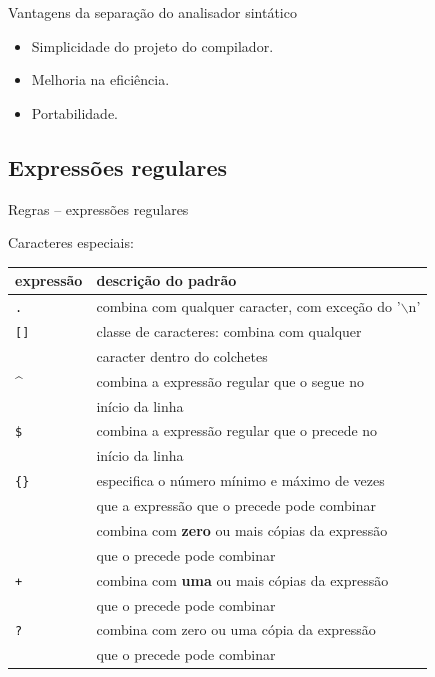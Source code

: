 \begin{frame}{Vantagens da separação do analisador sintático}

\pause

\begin{itemize}[<+->]
\item Simplicidade do projeto do compilador.\bigskip
\item Melhoria na eficiência.\bigskip
\item Portabilidade.
\end{itemize}

\end{frame}

\subsection{Expressões regulares}
\frame{\tableofcontents[currentsubsection]}

\begin{frame}{Regras -- expressões regulares}

 Caracteres especiais:\bigskip

 \footnotesize
 \center
\begin{tabular}{ll}\toprule
  \bf expressão  & \bf  descrição do padrão \\
  \midrule
  {\tt .}          &  combina com qualquer caracter, com exceção do '{$\backslash$n}'\\
  {\tt []}         &  classe de caracteres: combina com qualquer\\
                 &  caracter dentro do colchetes\\
   \^{}            &  combina a expressão regular que o segue no\\
                 &  início da linha\\
  {\tt \$}          &  combina a expressão regular que o precede no\\
                 &  início da linha\\
  {\tt \{\}}         &  especifica o número mínimo e máximo de vezes\\
                 &  que a expressão que o precede pode combinar\\
  {\tt *}          &  combina com {\bf zero} ou mais cópias da expressão\\
                 &  que o precede pode combinar\\
  {\tt +}          &  combina com {\bf uma} ou mais cópias da expressão\\
                 &  que o precede pode combinar\\
  {\tt ?}          &  combina com zero ou uma cópia da expressão\\
                 &  que o precede pode combinar\\
  \bottomrule
\end{tabular}
\end{frame}

